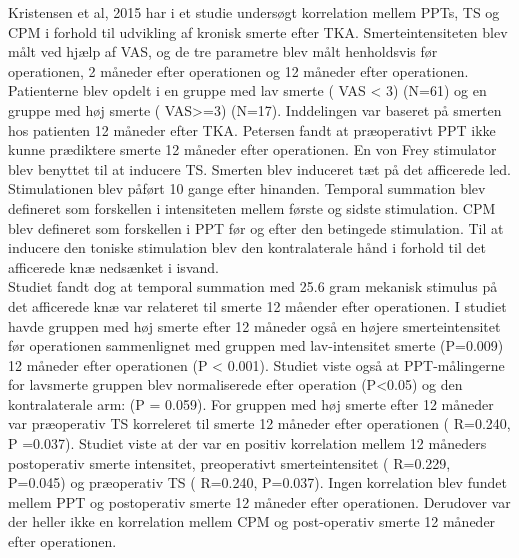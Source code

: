 Kristensen et al, 2015 har i et studie undersøgt korrelation mellem PPTs, TS og CPM i forhold til udvikling af kronisk smerte efter TKA. Smerteintensiteten blev målt ved hjælp af VAS, og de tre parametre blev målt henholdsvis før operationen, 2 måneder efter operationen og 12 måneder efter operationen. Patienterne blev opdelt i en gruppe med lav smerte ( VAS < 3) (N=61) og en  gruppe med høj smerte ( VAS>=3) (N=17). Inddelingen var baseret på smerten hos patienten 12 måneder efter TKA. Petersen fandt at præoperativt PPT ikke kunne prædiktere smerte 12 måneder efter operationen. En von Frey stimulator blev benyttet til at inducere TS. Smerten blev induceret tæt på det afficerede led. Stimulationen blev påført 10 gange efter hinanden. Temporal summation blev defineret som forskellen i intensiteten mellem første og sidste stimulation. CPM blev defineret som forskellen i PPT før og efter den betingede stimulation. Til at inducere den toniske stimulation blev den kontralaterale hånd i forhold til det afficerede knæ nedsænket i isvand.\\
Studiet fandt dog at temporal summation med 25.6 gram mekanisk stimulus på det afficerede knæ var relateret til smerte 12 måender efter operationen. I studiet havde gruppen med høj smerte efter 12 måneder også en højere smerteintensitet før operationen sammenlignet med gruppen med lav-intensitet smerte (P=0.009) 12 måneder efter operationen (P < 0.001). Studiet viste også at PPT-målingerne for lavsmerte gruppen blev normaliserede efter operation (P<0.05) og den kontralaterale arm: (P = 0.059). For gruppen med høj smerte efter 12 måneder var præoperativ TS korreleret til smerte 12 måneder efter operationen ( R=0.240, P =0.037).
Studiet viste at der var en positiv korrelation mellem 12 måneders postoperativ smerte intensitet, preoperativt smerteintensitet ( R=0.229, P=0.045) og præoperativ TS ( R=0.240, P=0.037). Ingen korrelation blev fundet mellem PPT og postoperativ smerte 12 måneder efter operationen. Derudover var der heller ikke en korrelation mellem CPM og post-operativ smerte 12 måneder efter operationen.





